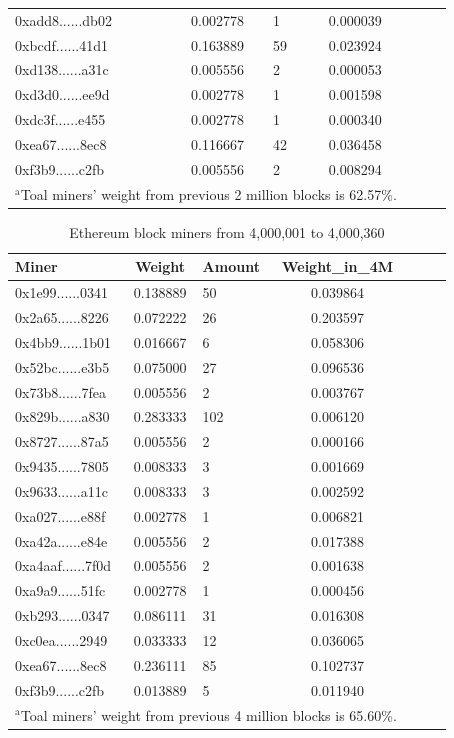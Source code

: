 \documentclass[conference]{IEEEtran}
\begin{document}
\begin{table}[htbp]
\begin{center}
\begin{tabular}{lclclcl}
0xadd8......db02 & 0.002778 & 1      & 0.000039       \\
0xbcdf......41d1 & 0.163889 & 59     & 0.023924       \\
0xd138......a31c & 0.005556 & 2      & 0.000053       \\
0xd3d0......ee9d & 0.002778 & 1      & 0.001598       \\
0xdc3f......e455 & 0.002778 & 1      & 0.000340       \\
0xea67......8ec8 & 0.116667 & 42     & 0.036458       \\
0xf3b9......c2fb & 0.005556 & 2      & 0.008294      \\
\hline
\multicolumn{4}{l}{$^{\mathrm{a}}$Toal miners' weight from previous 2 million blocks is 62.57\%.}
\end{tabular}
\end{center}
\end{table}

\begin{table}[htbp]
\caption{Ethereum block miners from 4,000,001 to 4,000,360}
\begin{center}
\begin{tabular}{lclclcl}
\hline
Miner                                      & Weight   & Amount & Weight\_in\_4M \\
\hline
0x1e99......0341 & 0.138889 & 50     & 0.039864       \\
0x2a65......8226 & 0.072222 & 26     & 0.203597       \\
0x4bb9......1b01 & 0.016667 & 6      & 0.058306       \\
0x52bc......e3b5 & 0.075000 & 27     & 0.096536       \\
0x73b8......7fea & 0.005556 & 2      & 0.003767       \\
0x829b......a830 & 0.283333 & 102    & 0.006120       \\
0x8727......87a5 & 0.005556 & 2      & 0.000166       \\
0x9435......7805 & 0.008333 & 3      & 0.001669       \\
0x9633......a11c & 0.008333 & 3      & 0.002592       \\
0xa027......e88f & 0.002778 & 1      & 0.006821       \\
0xa42a......e84e & 0.005556 & 2      & 0.017388       \\
0xa4aaf......7f0d & 0.005556 & 2      & 0.001638       \\
0xa9a9......51fc & 0.002778 & 1      & 0.000456       \\
0xb293......0347 & 0.086111 & 31     & 0.016308       \\
0xc0ea......2949 & 0.033333 & 12     & 0.036065       \\
0xea67......8ec8 & 0.236111 & 85     & 0.102737       \\
0xf3b9......c2fb & 0.013889 & 5      & 0.011940      \\
\hline
\multicolumn{4}{l}{$^{\mathrm{a}}$Toal miners' weight from previous 4 million blocks is 65.60\%.}
\end{tabular}
\end{center}
\end{table}
\end{document}
